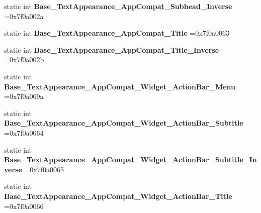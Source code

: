 \begin{DoxyCompactItemize}
\item 
\mbox{\label{classandroid_1_1support_1_1v7_1_1cardview_1_1R_1_1style_a8361b7ed9f4595473de206327a6779d0}} 
static int {\bfseries Base\+\_\+\+Text\+Appearance\+\_\+\+App\+Compat\+\_\+\+Subhead\+\_\+\+Inverse} =0x7f0a002a
\item 
\mbox{\label{classandroid_1_1support_1_1v7_1_1cardview_1_1R_1_1style_a757fac1fe916ee081dadd8ffb40d9dbb}} 
static int {\bfseries Base\+\_\+\+Text\+Appearance\+\_\+\+App\+Compat\+\_\+\+Title} =0x7f0a0063
\item 
\mbox{\label{classandroid_1_1support_1_1v7_1_1cardview_1_1R_1_1style_a17e71d11ec4aa71aa1892b576281ad51}} 
static int {\bfseries Base\+\_\+\+Text\+Appearance\+\_\+\+App\+Compat\+\_\+\+Title\+\_\+\+Inverse} =0x7f0a002b
\item 
\mbox{\label{classandroid_1_1support_1_1v7_1_1cardview_1_1R_1_1style_a3753c42c180f39970f10d098c9c965f7}} 
static int {\bfseries Base\+\_\+\+Text\+Appearance\+\_\+\+App\+Compat\+\_\+\+Widget\+\_\+\+Action\+Bar\+\_\+\+Menu} =0x7f0a009a
\item 
\mbox{\label{classandroid_1_1support_1_1v7_1_1cardview_1_1R_1_1style_a43c88a3b332323ac34a5f9029d98ebfa}} 
static int {\bfseries Base\+\_\+\+Text\+Appearance\+\_\+\+App\+Compat\+\_\+\+Widget\+\_\+\+Action\+Bar\+\_\+\+Subtitle} =0x7f0a0064
\item 
\mbox{\label{classandroid_1_1support_1_1v7_1_1cardview_1_1R_1_1style_a0f6aae6aee8e18486ac878236baeefb7}} 
static int {\bfseries Base\+\_\+\+Text\+Appearance\+\_\+\+App\+Compat\+\_\+\+Widget\+\_\+\+Action\+Bar\+\_\+\+Subtitle\+\_\+\+Inverse} =0x7f0a0065
\item 
\mbox{\label{classandroid_1_1support_1_1v7_1_1cardview_1_1R_1_1style_a661847af0d1aa6b8b345fd291981b08a}} 
static int {\bfseries Base\+\_\+\+Text\+Appearance\+\_\+\+App\+Compat\+\_\+\+Widget\+\_\+\+Action\+Bar\+\_\+\+Title} =0x7f0a0066

\end{DoxyCompactItemize}
